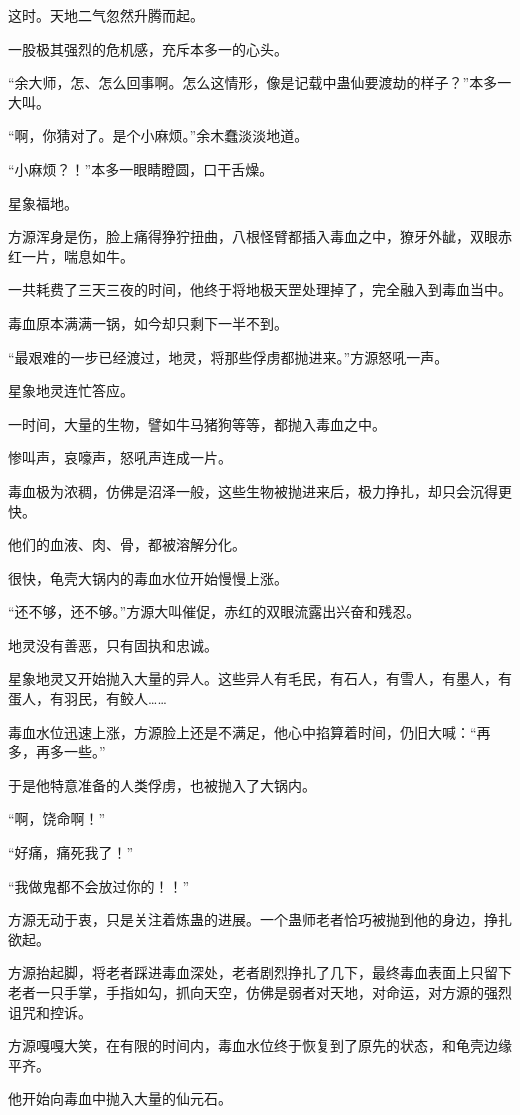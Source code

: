 \begin{this_body}
这时。天地二气忽然升腾而起。

一股极其强烈的危机感，充斥本多一的心头。

“余大师，怎、怎么回事啊。怎么这情形，像是记载中蛊仙要渡劫的样子？”本多一大叫。

“啊，你猜对了。是个小麻烦。”余木蠢淡淡地道。

“小麻烦？！”本多一眼睛瞪圆，口干舌燥。

星象福地。

方源浑身是伤，脸上痛得狰狞扭曲，八根怪臂都插入毒血之中，獠牙外龇，双眼赤红一片，喘息如牛。

一共耗费了三天三夜的时间，他终于将地极天罡处理掉了，完全融入到毒血当中。

毒血原本满满一锅，如今却只剩下一半不到。

“最艰难的一步已经渡过，地灵，将那些俘虏都抛进来。”方源怒吼一声。

星象地灵连忙答应。

一时间，大量的生物，譬如牛马猪狗等等，都抛入毒血之中。

惨叫声，哀嚎声，怒吼声连成一片。

毒血极为浓稠，仿佛是沼泽一般，这些生物被抛进来后，极力挣扎，却只会沉得更快。

他们的血液、肉、骨，都被溶解分化。

很快，龟壳大锅内的毒血水位开始慢慢上涨。

“还不够，还不够。”方源大叫催促，赤红的双眼流露出兴奋和残忍。

地灵没有善恶，只有固执和忠诚。

星象地灵又开始抛入大量的异人。这些异人有毛民，有石人，有雪人，有墨人，有蛋人，有羽民，有鲛人……

毒血水位迅速上涨，方源脸上还是不满足，他心中掐算着时间，仍旧大喊：“再多，再多一些。”

于是他特意准备的人类俘虏，也被抛入了大锅内。

“啊，饶命啊！”

“好痛，痛死我了！”

“我做鬼都不会放过你的！！”

方源无动于衷，只是关注着炼蛊的进展。一个蛊师老者恰巧被抛到他的身边，挣扎欲起。

方源抬起脚，将老者踩进毒血深处，老者剧烈挣扎了几下，最终毒血表面上只留下老者一只手掌，手指如勾，抓向天空，仿佛是弱者对天地，对命运，对方源的强烈诅咒和控诉。

方源嘎嘎大笑，在有限的时间内，毒血水位终于恢复到了原先的状态，和龟壳边缘平齐。

他开始向毒血中抛入大量的仙元石。


\end{this_body}

